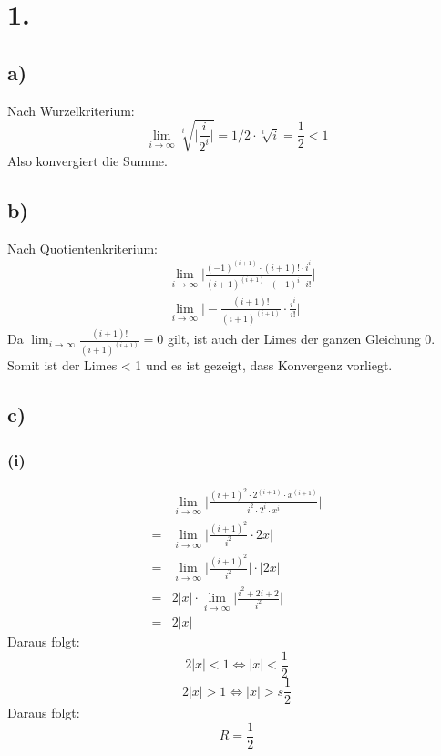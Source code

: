 \documentclass[a4paper]{scrartcl}
\title{\titleinfo}
\author{Elena Noll, Sven-Hendrik Haase, Arne Struck}
\date{\today}
\begin{document}
\maketitle
\notag

\section{1.}
\subsection{a)}
Nach Wurzelkriterium:
\[ \lim_{i\to\infty} \sqrt[i]{\bigg| \frac{i}{2^i} \bigg|} = 1/2 \cdot \sqrt[i]{i} = \frac{1} {2} < 1 \]
Also konvergiert die Summe.

\subsection{b)}
Nach Quotientenkriterium:
\begin{align}
&\lim_{i\to\infty} \bigg| \frac{(-1)^{(i+1)} \cdot (i+1)! \cdot i^i} {(i+1)^{(i+1)} \cdot (-1)^i \cdot i!} \bigg| \\
&\lim_{i\to\infty} \bigg| - \frac{(i+1)!} {(i+1)^{(i+1)}} \cdot \frac{i^i} {i!} \bigg|
\end{align}
Da \(\lim_{i\to\infty} \frac{(i+1)!} {(i+1)^{(i+1)}} = 0\) gilt, ist auch der Limes der ganzen Gleichung 0. \\
Somit ist der Limes < 1 und es ist gezeigt, dass Konvergenz vorliegt. 

\subsection{c)}
\subsubsection{(i)}
\begin{align}
  &\lim_{i\to\infty} \bigg| \frac{(i+1)^2 \cdot 2^{(i+1)} \cdot x^{(i+1)}} {i^2 \cdot 2^i \cdot x^i} \bigg| \\
= &\lim_{i\to\infty} \bigg| \frac{(i+1)^2} {i^2} \cdot 2x \bigg| \\
= &\lim_{i\to\infty} \bigg| \frac{(i+1)^2} {i^2} \bigg| \cdot |2x| \\
= & 2|x| \cdot \lim_{i\to\infty} \bigg| \frac{i^2 + 2i + 2} {i^2} \bigg| \\
= & 2|x|
\end{align}
Daraus folgt: 
\[2|x| < 1 \Leftrightarrow |x| < \frac{1}{2}\]
\[2|x| > 1 \Leftrightarrow |x| >s \frac{1}{2}\]
Daraus folgt: \\
\[R = \frac{1}{2}\]
\end{document}
